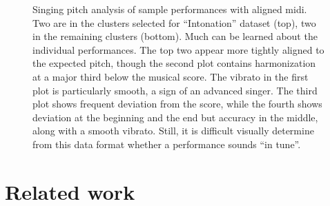 \begin{figure}[h!]
    \vspace{-0.5in}
    \caption{Singing pitch analysis of sample performances with aligned \gls{midi}. Two are in the clusters selected for  ``Intonation'' dataset (top), two in the remaining clusters (bottom). Much can be learned about the individual performances. The top two appear more tightly aligned to the expected pitch, though the second plot contains harmonization at a major third below the musical score. The vibrato in the first plot is particularly smooth, a sign of an advanced singer. The third plot shows frequent deviation from the score, while the fourth shows deviation at the beginning and the end but accuracy in the middle, along with a smooth vibrato. Still, it is difficult visually determine from this data format whether a performance sounds ``in tune''.}
    \label{fig:sample_intonation}
\end{figure}

\section{Related work}
\label{sec:related}

